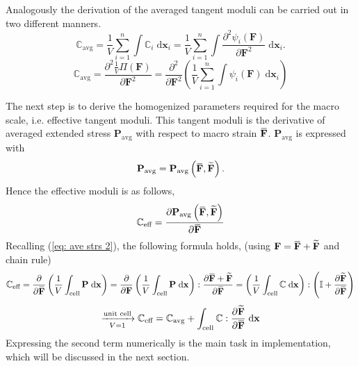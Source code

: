 \documentclass[10pt,a4paper]{scrreprt}
\newcommand{\myd}{\;\mathrm{d}}
\newcommand{\overbar}[1]{\mkern 1.5mu\overline{\mkern-1.5mu#1\mkern-1.5mu}\mkern 1.5mu}
\begin{document}
Analogously the derivation of the averaged tangent moduli can be carried out in two different manners. 
\begin{equation}
\label{eq: tan mod}
\mathbb{C}_{\text{avg}} = \dfrac{1}{V} \sum^{n}_{i=1} \int \mathbb{C}_{i} \myd{\mathbf{x}_{i}} = \dfrac{1}{V} \sum^{n}_{i=1} \int \dfrac{\partial^{2} \psi_{i}(\mathbf{F})}{\partial \mathbf{F}^{2}} \myd{\mathbf{x}_{i}}.
\end{equation}
\begin{equation}
\label{eq: tan mod 2}
\mathbb{C}_{\text{avg}} = \dfrac{\partial^{2} \tfrac{1}{V} \Pi(\mathbf{F})}{\partial \mathbf{F}^{2}} = \dfrac{\partial^{2}}{\partial \mathbf{F}^{2}} \left( \dfrac{1}{V} \sum^{n}_{i=1} \int \psi_{i}(\mathbf{F}) \myd{\mathbf{x}_{i}} \right)
\end{equation}

The next step is to derive the homogenized parameters required for the macro scale, i.e. effective tangent moduli. This tangent moduli is the derivative of averaged extended stress $\mathbf{P}_{\text{avg}}$ with respect to macro strain $\overbar{\mathbf{F}}$. $\mathbf{P}_{\text{avg}}$ is expressed with 
\begin{equation}
\mathbf{P}_{\text{avg}} = \mathbf{P}_{\text{avg}} \left( \overbar{\mathbf{F}}, \widetilde{\mathbf{F}} \right).
\end{equation}
Hence the effective moduli is as follows,
\begin{equation}
\mathbb{C}_{\text{eff}} = \dfrac{\partial \mathbf{P}_{\text{avg}} \left( \overbar{\mathbf{F}}, \widetilde{\mathbf{F}} \right)}{\partial \overbar{\mathbf{F}}}
\end{equation}
Recalling (\ref{eq: ave strs 2}), the following formula holds, (using $\mathbf{F} = \overbar{\mathbf{F}} + \widetilde{\mathbf{F}}$ and chain rule)
\[
\mathbb{C}_{\text{eff}} = \dfrac{\partial}{\partial \overbar{\mathbf{F}}} \left( \dfrac{1}{V} \int_{\text{cell}} \mathbf{P} \myd{\mathbf{x}} \right) = \dfrac{\partial}{\partial \mathbf{F}} \left( \dfrac{1}{V} \int_{\text{cell}} \mathbf{P} \myd{\mathbf{x}} \right) : \dfrac{\partial \overbar{\mathbf{F}} + \widetilde{\mathbf{F}}}{\partial \overbar{\mathbf{F}}} =  \left( \dfrac{1}{V} \int_{\text{cell}}  \mathbb{C} \myd{\mathbf{x}} \right) : \left( \mathbb{I} + \dfrac{\partial \widetilde{\mathbf{F}}}{\partial \overbar{\mathbf{F}}} \right)
\]
\begin{equation}
\label{eq: c eff}
\xrightarrow[ V = 1]{\text{unit cell}} \mathbb{C}_{\text{eff}} = \mathbb{C}_{\text{avg}} + \int_{\text{cell}}  \mathbb{C} : \dfrac{\partial \widetilde{\mathbf{F}}}{\partial \overbar{\mathbf{F}}} \myd{\mathbf{x}} 
\end{equation}
Expressing the second term numerically is the main task in implementation, which will be discussed in the next section.
\end{document}
